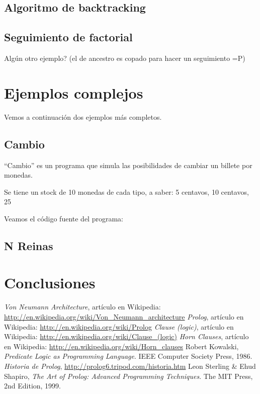 \documentclass[12pt,titlepage]{article}
\begin{document}
\subsection{Algoritmo de backtracking}
\subsection{Seguimiento de factorial}
    Algún otro ejemplo? (el de ancestro es copado para hacer un seguimiento =P)

\newpage
\section{Ejemplos complejos}

Vemos a continuación dos ejemplos más completos.

\subsection{Cambio}

``Cambio'' es un programa que simula las posibilidades de cambiar un billete por monedas.

Se tiene un stock de 10 monedas de cada tipo, a saber: 5 centavos, 10 centavos, 25

Veamos el código fuente del programa:




\subsection{N Reinas}

\newpage
\section{Conclusiones}


\clearpage
\begin{thebibliography}{9}
     \emph{Von Neumann Architecture}, artículo en Wikipedia: \url{http://en.wikipedia.org/wiki/Von\_Neumann\_architecture}
     \emph{Prolog}, artículo en Wikipedia: \url{http://en.wikipedia.org/wiki/Prolog}
     \emph{Clause (logic)}, artículo en Wikipedia: \url{http://en.wikipedia.org/wiki/Clause_(logic)}
     \emph{Horn Clauses}, artículo en Wikipedia: \url{http://en.wikipedia.org/wiki/Horn_clauses}
     Robert Kowalski, \emph{Predicate Logic as Programming Language}. IEEE Computer Society Press, 1986.
     \emph{Historia de Prolog}, \url{http://prolog6.tripod.com/historia.htm}
     Leon Sterling \& Ehud Shapiro, \emph{The Art of Prolog: Advanced Programming Techniques}. The MIT Press, 2nd Edition, 1999.
\end{thebibliography}

\end{document}

